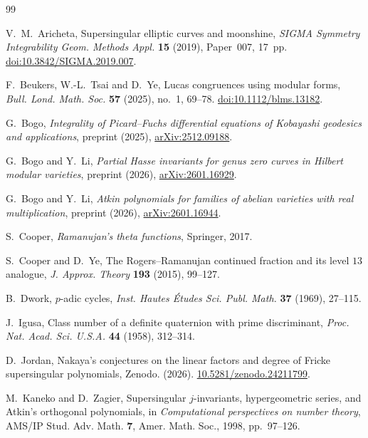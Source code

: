 \documentclass[11pt,a4paper]{article}
\theoremstyle{definition}
\theoremstyle{remark}
\numberwithin{equation}{section}
\begin{document}
\begin{thebibliography}{99}

V.~M.~Aricheta, Supersingular elliptic curves and moonshine,
\emph{SIGMA Symmetry Integrability Geom. Methods Appl.} \textbf{15} (2019),
Paper~007, 17~pp.
\href{https://doi.org/10.3842/SIGMA.2019.007}{doi:10.3842/SIGMA.2019.007}.

F.~Beukers, W.-L.~Tsai and D.~Ye, Lucas congruences using modular forms,
\emph{Bull. Lond. Math. Soc.} \textbf{57} (2025), no.~1, 69--78.
\href{https://doi.org/10.1112/blms.13182}{doi:10.1112/blms.13182}.

G.~Bogo, \emph{Integrality of Picard--Fuchs differential equations of Kobayashi
geodesics and applications}, preprint (2025),
\href{https://arxiv.org/abs/2512.09188}{arXiv:2512.09188}.

G.~Bogo and Y.~Li, \emph{Partial Hasse invariants for genus zero curves in
Hilbert modular varieties}, preprint (2026),
\href{https://arxiv.org/abs/2601.16929}{arXiv:2601.16929}.

G.~Bogo and Y.~Li, \emph{Atkin polynomials for families of abelian varieties
with real multiplication}, preprint (2026),
\href{https://arxiv.org/abs/2601.16944}{arXiv:2601.16944}.

S.~Cooper, \emph{Ramanujan's theta functions}, Springer, 2017.

S.~Cooper and D.~Ye, The Rogers--Ramanujan continued fraction and its level
$13$ analogue, \emph{J. Approx. Theory} \textbf{193} (2015), 99--127.

B.~Dwork, $p$-adic cycles, \emph{Inst. Hautes \'Etudes Sci. Publ. Math.}
\textbf{37} (1969), 27--115.

J.~Igusa, Class number of a definite quaternion with prime discriminant,
\emph{Proc. Nat. Acad. Sci. U.S.A.} \textbf{44} (1958), 312--314.

D.~Jordan, {Nakaya’s conjectures on the linear factors and degree of Fricke supersingular polynomials}, Zenodo. (2026). \href{https://doi.org/10.5281/zenodo.24211799}{10.5281/zenodo.24211799}.

M.~Kaneko and D.~Zagier, Supersingular $j$-invariants, hypergeometric series,
and Atkin's orthogonal polynomials, in \emph{Computational perspectives on
number theory}, AMS/IP Stud. Adv. Math. \textbf{7}, Amer. Math. Soc., 1998,
pp.~97--126.


\end{thebibliography}
\end{document}
